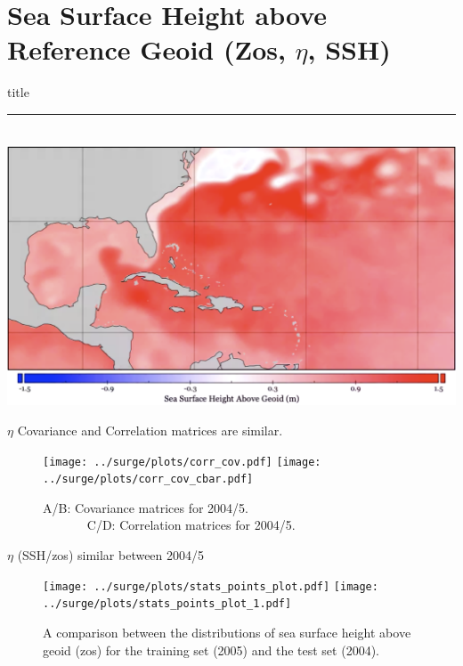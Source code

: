 \documentclass[usenames, dvipsnames]{beamer}
\begin{document}
\section{Sea Surface Height above Reference Geoid (Zos, $\eta$, SSH) }
    \begin{frame}[plain]
        \vfill
      \centering
      \begin{beamercolorbox}[sep=8pt,center,shadow=true,rounded=true]{title}
        \insertsectionhead\par%
        \color{oxfordblue}\noindent\rule{10cm}{1pt} \\
        \includegraphics[width=0.93\linewidth]{images/example-images/zos-image.png}
      \end{beamercolorbox}
      \vfill
  \end{frame}

  \begin{frame}{$\eta$ Covariance and Correlation matrices are similar. }
\vspace{-20pt}
\begin{figure}[htb!]
    \centering
    \hspace{-10pt}
    \texttt{[image: ../surge/plots/corr\_cov.pdf]}
            \texttt{[image: ../surge/plots/corr\_cov\_cbar.pdf]}
    \vspace{-7pt}
    \caption{A/B: Covariance matrices for 2004/5.\\
             $\quad\quad\quad\;\;$C/D: Correlation matrices for 2004/5.}
    \label{fig:}
\end{figure}
\end{frame}

\begin{frame}{ $\eta$ (SSH/zos) similar between 2004/5 }
\vspace{-20pt}
\begin{figure}[htb!]
    \centering
    \texttt{[image: ../surge/plots/stats\_points\_plot.pdf]}
       \hspace{0pt} \texttt{[image: ../surge/plots/stats\_points\_plot\_1.pdf]}
    \vspace{-7pt}
    \caption{A comparison between the distributions of sea surface height
     above geoid (zos) for the training set (2005) and the test set (2004).}
\end{figure}
\end{frame}
\end{document}
